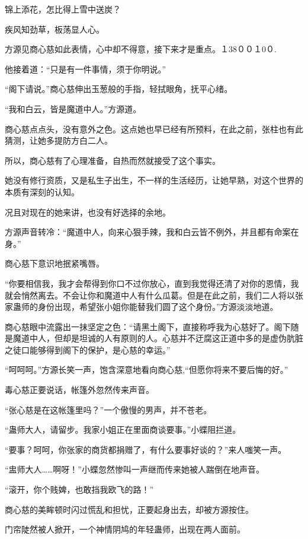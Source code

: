 
\begin{this_body}

锦上添花，怎比得上雪中送炭？

疾风知劲草，板荡显人心。

方源见商心慈如此表情，心中却不得意，接下来才是重点。１38００１0０.

他接着道：“只是有一件事情，须于你明说。”

“阁下请说。”商心慈伸出玉葱般的手指，轻拭眼角，抚平心绪。

“我和白云，皆是魔道中人。”方源道。

商心慈点点头，没有意外之色。这点她也早已经有所预料，在此之前，张柱也有此猜测，让她多提防方白二人。

所以，商心慈有了心理准备，自热而然就接受了这个事实。

她没有修行资质，又是私生子出生，不一样的生活经历，让她早熟，对这个世界的本质有深刻的认知。

况且对现在的她来讲，也没有好选择的余地。

方源声音转冷：“魔道中人，向来心狠手辣，我和白云皆不例外，并且都有命案在身。”

商心慈下意识地抿紧嘴唇。

“你要相信我，我才会帮得到你口不过你放心，直到我觉得还清了对你的恩情，我就会悄然离去。不会让你和魔道中人有什么瓜葛。但是在此之前，我们二人将以张家蛊师的身份出现，希望张小姐你能替我们圆了这个身份。”方源淡淡地道。

商心慈眼中流露出一抹坚定之色：“请黑土阁下，直接称呼我为心慈好了。阁下随是魔道中人，但却是坦诚的人有原则的人。心慈并不迂腐这正道中多的是虚伪肮脏之徒口能够得到阁下的保护，是心慈的幸运。”

“呵呵呵。”方源长笑一声，饱含深意地看向商心慈,“但愿你将来不要后悔的好。”

毒心慈正要说话，帐篷外忽然传来声音。

“张心慈是在这帐篷里吗？”一个傲慢的男声，并不苍老。

“蛊师大人，请留步。我家小姐正在里面商谈要事。”小蝶阻拦道。

“要事？呵呵，你张家的商货都捐赠了，有什么要事好谈的？”来人嗤笑一声。

“盅师大人……啊呀！”小蝶忽然惨叫一声继而传来她被人踹倒在地声音。

“滚开，你个贱婢，也敢挡我欧飞的路！”

商心慈的美眸顿时闪过慌乱和担忧，正要起身出去，却被方源按住。

门帘陡然被人掀开，一个神情阴鸠的年轻蛊师，出现在两人面前。


\end{this_body}
